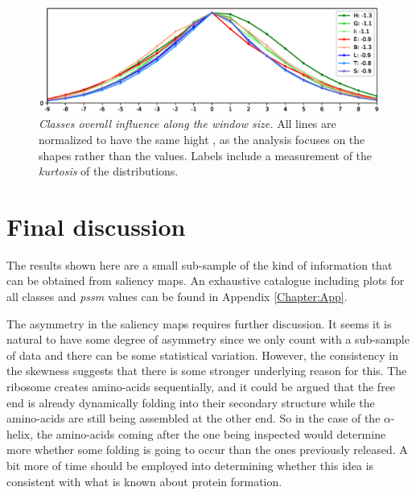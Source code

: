 \begin{figure}
	\centering
	\includegraphics[width=1\linewidth]{Figures/sheer_class_aa}
	\caption{\textit{Classes overall influence along the window size.} All lines are normalized to have the same hight , as the analysis focuses on the shapes rather than the values. Labels include a measurement of the \textit{kurtosis} of the distributions.}
	\label{fig:sheer_class_aa}
\end{figure}




\section{Final discussion}
The results shown here are a small sub-sample of the kind of information that can be obtained from saliency maps. An exhaustive catalogue including plots for all classes and \textit{pssm} values can be found in Appendix \ref{Chapter:App}.

The asymmetry in the saliency maps requires further discussion. It seems it is natural to have some degree of asymmetry since we only count with a sub-sample of data and there can be some statistical variation. However, the consistency in the skewness suggests that there is some stronger underlying reason for this. The ribosome creates amino-acids sequentially, and it could be argued that the free end is already dynamically folding into their secondary structure while the amino-acids are still being assembled at the other end. So in the case of the $\alpha$-helix, the amino-acids coming after the one being inspected would determine more whether some folding is going to occur than the ones previously released. A bit more of time should be employed into determining whether this idea is consistent with what is known about protein formation.

